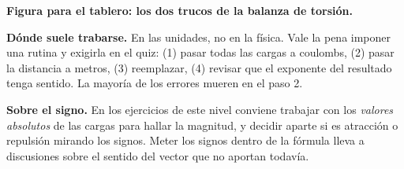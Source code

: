 \documentclass[11pt]{article}
\begin{document}
\textbf{Figura para el tablero: los dos trucos de la balanza de torsión.}

\begin{center}
\end{center}

\begin{nota}
\textbf{Dónde suele trabarse.} En las unidades, no en la física. Vale la pena imponer una
rutina y exigirla en el quiz: (1) pasar todas las cargas a coulombs, (2) pasar la distancia a
metros, (3) reemplazar, (4) revisar que el exponente del resultado tenga sentido. La mayoría
de los errores mueren en el paso 2.
\end{nota}

\begin{nota}
\textbf{Sobre el signo.} En los ejercicios de este nivel conviene trabajar con los
\emph{valores absolutos} de las cargas para hallar la magnitud, y decidir aparte si es
atracción o repulsión mirando los signos. Meter los signos dentro de la fórmula lleva a
discusiones sobre el sentido del vector que no aportan todavía.
\end{nota}
\end{document}
